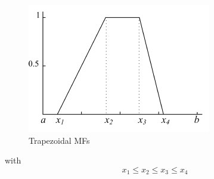 \documentclass[runningheads,a4paper]{llncs}
\begin{document}
\begin{figure}[!ht] 
	\begin{center}
		\includegraphics[scale=0.95]{fig/trapese}
		\caption {Trapezoidal MFs}
		\label{trapeze}
	\end{center}
\end{figure}  


with
\begin{equation}
x_{1} \leq x_{2} \leq x_{3} \leq x_{4}
\end{equation}
\end{document}
